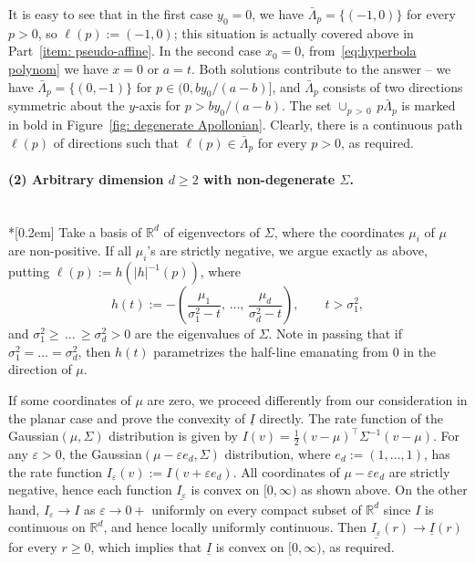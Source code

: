\documentclass[10pt]{amsart}
\theoremstyle{definition}\newtheorem{defi}[theo]{Definition}\newtheorem{rema}[theo]{Remark}\newtheorem{exam}[theo]{Example}\newtheorem{exem}[theo]{Example}\newtheorem{nota}[theo]{Notation}
\newcommand{\ubar}[1]{\underline{#1}}
\newcommand{\Rbb}{\mathbb{R}}
\begin{document}
\begin{proofc}
It is easy to see that in the first case $y_0=0$, we have $\bar \Lambda_p = \{(-1, 0)\}$ for every $p>0$, so $\ell(p):=(-1,0)$; this situation is actually covered above in Part~\eqref{item: pseudo-affine}. In the second case $x_0=0$, from~\eqref{eq:hyperbola polynom} we have $x=0$ or $a=t$. Both solutions contribute to the answer -- we have $\bar \Lambda_p = \{(0,-1)\}$ for $p \in (0, b y_0/(a-b)]$, and $\bar \Lambda_p$ consists of two directions symmetric about the $y$-axis for $p >b y_0/(a-b)$. The set $\cup_{p\,>\,0}\,p\bar \Lambda_p$ is marked in bold in Figure~\ref{fig: degenerate Apollonian}. Clearly, there is a continuous path $\ell(p)$ of directions such that $\ell(p) \in \bar \Lambda_p$ for every $p>0$, as required.


\paragraph{\label{part2}(2) Arbitrary dimension $d \ge 2$ with non-degenerate $\Sigma$.}\ \\*[0.2em]
Take a basis of $\Rbb^d$ of eigenvectors of $\Sigma$, where the coordinates $\mu_i$ of $\mu$ are non-positive. If all $\mu_i$'s are strictly negative, we argue exactly as above, putting $\ell(p):=h(|h|^{-1}(p))$, where
\[
h(t):= -\left(\frac{\mu_1}{\sigma_1^2-t},\,\ldots,\,\frac{\mu_d}{\sigma_d^2-t} \right), \qquad t>\sigma_1^2,
\]
and $\sigma_1^2 \ge\,\ldots\,\ge \sigma_d^2 >0$ are the eigenvalues of $\Sigma$. Note in passing that if $\sigma_1^2 = \ldots =\sigma_d^2 $, then $h(t)$ parametrizes the half-line emanating from $0$ in the direction of $\mu$.

If some coordinates of $\mu$ are zero, we proceed differently from our consideration in the planar case and prove the convexity of $\ubar I$ directly. The rate function of the Gaussian$(\mu, \Sigma)$ distribution is given by $I(v)=\frac12 (v-\mu)^\top \Sigma^{-1}(v-\mu)$. For any $\varepsilon >0$, the Gaussian$(\mu-\varepsilon e_d, \Sigma)$ distribution, where $e_d:=(1, \ldots, 1)$, has the rate function $I_\varepsilon(v):=I(v+\varepsilon e_d)$. All coordinates of $\mu-\varepsilon e_d$ are strictly negative, hence each function $\ubar{I_\varepsilon}$ is convex on $[0, \infty)$ as shown above. On the other hand, $I_\varepsilon \to I$ as $\varepsilon \to 0+$ uniformly on every compact subset of $\Rbb^d$ since $I$ is continuous on $\Rbb^d$, and hence locally uniformly continuous. Then $\ubar{I_\varepsilon}(r) \to \ubar I(r)$ for every $r \ge 0$, which implies that $\ubar I$ is convex on $[0, \infty)$, as required.

\end{proofc}
\end{document}
